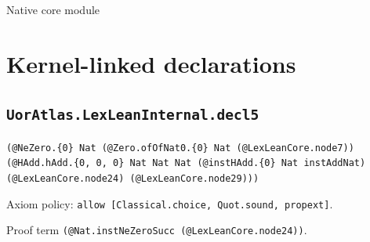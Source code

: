 \documentclass[11pt]{article}
\begin{document}
\begin{center}{\LARGE Native core module}\end{center}
\section*{Kernel-linked declarations}
\subsection*{\texttt{UorAtlas.LexLeanInternal.decl5}}
\noindent\texttt{(@NeZero.\{0\} Nat (@Zero.ofOfNat0.\{0\} Nat (@LexLeanCore.node7)) (@HAdd.hAdd.\{0, 0, 0\} Nat Nat Nat (@instHAdd.\{0\} Nat instAddNat) (@LexLeanCore.node24) (@LexLeanCore.node29)))}\par
\noindent Axiom policy: \texttt{allow [Classical.choice, Quot.sound, propext]}.\par
\noindent Proof term \texttt{(@Nat.instNeZeroSucc (@LexLeanCore.node24))}.\par
\end{document}
